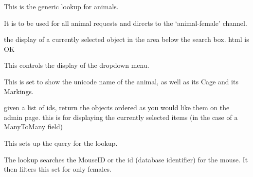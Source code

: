 \documentclass[letterpaper,10pt,english]{sphinxmanual}
\begin{document}

\begin{fulllineitems}
\label{animals:mousedb.animal.lookups.AnimalLookupFemale}
This is the generic lookup for animals.

It is to be used for all animal requests and directs to the `animal-female' channel.

\begin{fulllineitems}
\label{animals:mousedb.animal.lookups.AnimalLookupFemale.format_item}
the display of a currently selected object in the area below the search box. html is OK

\end{fulllineitems}


\begin{fulllineitems}
\label{animals:mousedb.animal.lookups.AnimalLookupFemale.format_result}
This controls the display of the dropdown menu.

This is set to show the unicode name of the animal, as well as its Cage and its Markings.

\end{fulllineitems}


\begin{fulllineitems}
\label{animals:mousedb.animal.lookups.AnimalLookupFemale.get_objects}
given a list of ids, return the objects ordered as you would like them on the admin page.
this is for displaying the currently selected items (in the case of a ManyToMany field)

\end{fulllineitems}


\begin{fulllineitems}
\label{animals:mousedb.animal.lookups.AnimalLookupFemale.get_query}
This sets up the query for the lookup.

The lookup searches the MouseID or the id (database identifier) for the mouse.  It then filters this set for only females.

\end{fulllineitems}


\end{fulllineitems}
\end{document}
